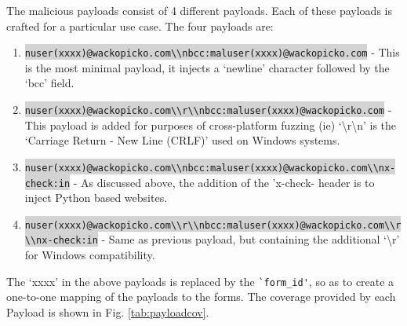 The malicious payloads consist of 4 different payloads. Each of these payloads is crafted for a particular use case. The four payloads are:
\begin{enumerate}
	\item
	\colorbox{lightgray}{\lstinline{nuser(xxxx)@wackopicko.com\\nbcc:maluser(xxxx)@wackopicko.com}} - This is the most minimal payload, it injects a `newline' character followed by the `bcc' field.
	\item \colorbox{lightgray}{\lstinline{nuser(xxxx)@wackopicko.com\\r\\nbcc:maluser(xxxx)@wackopicko.com}} - This payload is added for purposes of cross-platform fuzzing (ie) `\textbackslash{}r\textbackslash{}n' is the `Carriage Return - New Line (CRLF)' used on Windows systems. 
	\item \colorbox{lightgray}{\lstinline{nuser(xxxx)@wackopicko.com\\nbcc:maluser(xxxx)@wackopicko.com\\nx-check:in}} - As discussed above, the addition of the 'x-check- header is to inject Python based websites.
	\item \colorbox{lightgray}{\lstinline{nuser(xxxx)@wackopicko.com\\r\\nbcc:maluser(xxxx)@wackopicko.com\\r\\nx-check:in}} - Same as previous payload, but containing the additional `\textbackslash{}r' for Windows compatibility.
	
\end{enumerate}
The `xxxx' in the above payloads is replaced by the \lstinline{`form_id'}, so as to create a one-to-one mapping of the payloads to the forms. The coverage provided by each Payload is shown in Fig. \ref{tab:payloadcov}.\\

